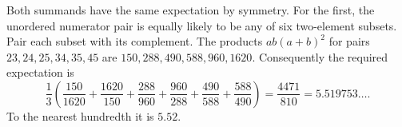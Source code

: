 Both summands have the same expectation by symmetry. For the first, the unordered numerator pair is equally likely to be any of six two-element subsets. Pair each subset with its complement. The products $ab(a+b)^2$ for pairs $23,24,25,34,35,45$ are $150,288,490,588,960,1620$. Consequently the required expectation is\[\dfrac{1}{3}\left(\dfrac{150}{1620}+\dfrac{1620}{150}+\dfrac{288}{960}+\dfrac{960}{288}+\dfrac{490}{588}+\dfrac{588}{490}\right)=\dfrac{4471}{810}=5.519753\ldots.\]To the nearest hundredth it is $\boxed{5.52}$.
